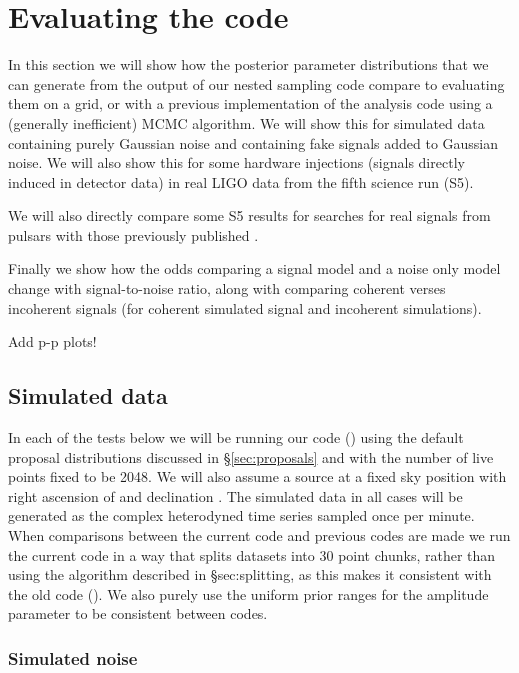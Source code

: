 \section{Evaluating the code}

In this section we will show how the posterior parameter distributions that we can generate from the output
of our nested sampling code compare to evaluating them on a grid, or with a previous implementation of the analysis code
\citep[\lppe used in e.g.][]{2014ApJ...785..119A} using a (generally inefficient) MCMC algorithm. We will show this for
simulated data containing purely Gaussian noise and containing fake signals added to Gaussian noise. We will also
show this for some hardware injections (signals directly induced in detector data) in real LIGO data from the fifth
science run (S5).

We will also directly compare some S5 results for searches for real signals from pulsars with those previously published
\citep{2010ApJ...713..671A}.

Finally we show how the odds comparing a signal model and a noise only model change with signal-to-noise ratio, along
with comparing coherent verses incoherent signals (for coherent simulated signal and incoherent simulations).

Add p-p plots!

\subsection{Simulated data}

In each of the tests below we will be running our code (\lppen) using the default proposal distributions discussed in \S\ref{sec:proposals}
and with the number of live points fixed to be 2048. We will also assume a source at a fixed sky position with right ascension of
 and declination . The simulated data in all cases will be generated as the complex heterodyned
time series sampled once per minute. When comparisons between the current code and previous codes are 
made we run the current code in a way that splits datasets into 30 point chunks, rather than using the algorithm described in \S{sec:splitting},
as this makes it consistent with the old code (\lppe). We also purely use the uniform prior ranges for the amplitude parameter to be
consistent between codes.

\subsubsection{Simulated noise}

